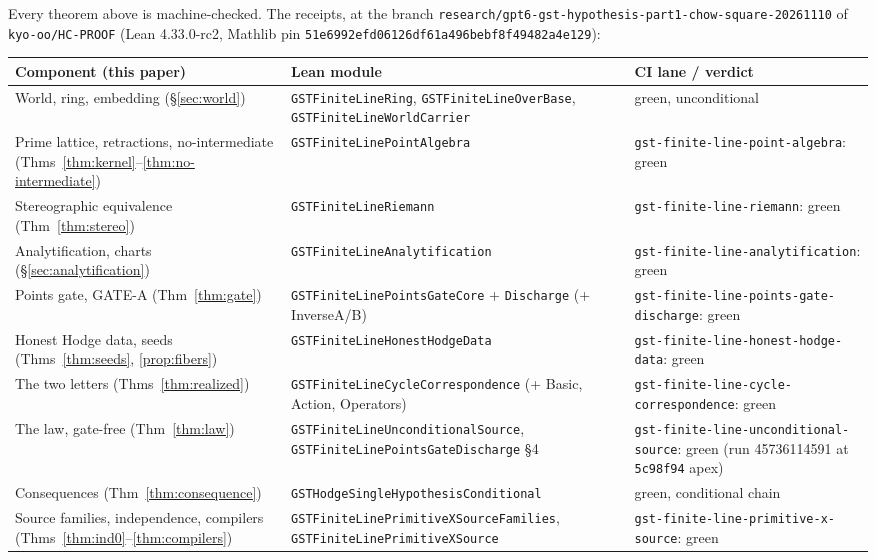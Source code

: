 \documentclass[11pt,a4paper]{article}
\theoremstyle{plain}
\theoremstyle{definition}
\begin{document}
Every theorem above is machine-checked.  The receipts, at the branch
\texttt{research/gpt6-gst-hypothesis-part1-chow-square-20261110} of
\texttt{kyo-oo/HC-PROOF} (Lean 4.33.0-rc2, Mathlib pin
\texttt{51e6992efd06126df61a496bebf8f49482a4e129}):

\begin{longtable}{@{}p{}p{}p{}@{}}
\toprule
\textbf{Component (this paper)} & \textbf{Lean module} &
\textbf{CI lane / verdict}\\
\midrule
\endhead
World, ring, embedding (\S\ref{sec:world}) &
\texttt{GSTFiniteLineRing}, \texttt{GSTFiniteLineOverBase},
\texttt{GSTFiniteLineWorldCarrier} & green, unconditional\\
Prime lattice, retractions, no-intermediate
(Thms~\ref{thm:kernel}--\ref{thm:no-intermediate}) &
\texttt{GSTFiniteLinePointAlgebra} &
\texttt{gst-finite-line-point-algebra}: green\\
Stereographic equivalence (Thm~\ref{thm:stereo}) &
\texttt{GSTFiniteLineRiemann} & \texttt{gst-finite-line-riemann}:
green\\
Analytification, charts (\S\ref{sec:analytification}) &
\texttt{GSTFiniteLineAnalytification} &
\texttt{gst-finite-line-analytification}: green\\
Points gate, GATE-A (Thm~\ref{thm:gate}) &
\texttt{GSTFiniteLinePointsGateCore} + \texttt{Discharge} (+ InverseA/B) &
\texttt{gst-finite-line-points-gate-discharge}: green\\
Honest Hodge data, seeds (Thms~\ref{thm:seeds},
\ref{prop:fibers}) & \texttt{GSTFiniteLineHonestHodgeData} &
\texttt{gst-finite-line-honest-hodge-data}: green\\
The two letters (Thms~\ref{thm:realized}) &
\texttt{GSTFiniteLineCycleCorrespondence} (+ Basic, Action,
Operators) & \texttt{gst-finite-line-cycle-correspondence}:
green\\
The law, gate-free (Thm~\ref{thm:law}) &
\texttt{GSTFiniteLineUnconditionalSource},
\texttt{GSTFiniteLinePointsGateDischarge} \S4 &
\texttt{gst-finite-line-unconditional-source}: green (run
45736114591 at \texttt{5c98f94} apex)\\
Consequences (Thm~\ref{thm:consequence}) &
\texttt{GSTHodgeSingleHypothesisConditional} & green, conditional
chain\\
Source families, independence, compilers
(Thms~\ref{thm:ind0}--\ref{thm:compilers}) &
\texttt{GSTFiniteLinePrimitiveXSourceFamilies},
\texttt{GSTFiniteLinePrimitiveXSource} &
\texttt{gst-finite-line-primitive-x-source}: green\\

\end{longtable}
\end{document}
